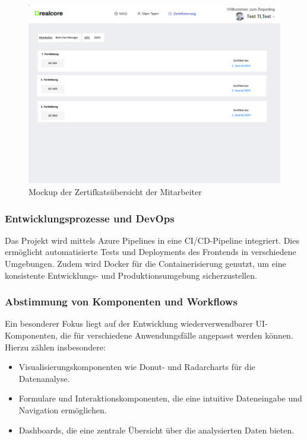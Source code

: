 \begin{figure}[h!]
    \centering
    \includegraphics[width=1.2\textwidth]{images/Zertifikat.png}
    \caption{Mockup der Zertifkatsübersicht der Mitarbeiter}
    \label{fig:mockup3}
\end{figure}

\subsubsection*{Entwicklungsprozesse und DevOps} 
Das Projekt wird mittels Azure Pipelines in eine CI/CD-Pipeline integriert. Dies ermöglicht automatisierte Tests und Deployments des Frontends in verschiedene Umgebungen. Zudem wird Docker für die Containerisierung genutzt, um eine konsistente Entwicklungs- und Produktionsumgebung sicherzustellen.

\subsubsection*{Abstimmung von Komponenten und Workflows} 
Ein besonderer Fokus liegt auf der Entwicklung wiederverwendbarer UI-Komponenten, die für verschiedene Anwendungsfälle angepasst werden können. Hierzu zählen insbesondere: 
\begin{itemize}
    \item Visualisierungskomponenten wie Donut- und Radarcharts für die Datenanalyse.
    \item Formulare und Interaktionskomponenten, die eine intuitive Dateneingabe und Navigation ermöglichen.
    \item Dashboards, die eine zentrale Übersicht über die analysierten Daten bieten.
\end{itemize}

